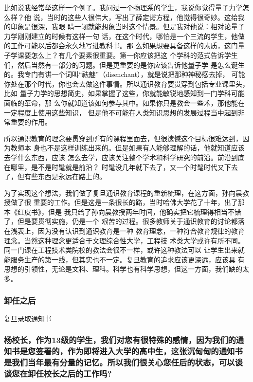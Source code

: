 \documentclass[11pt]{ctexart}
\begin{document}
{{{{比如说我经常举这样一个例子。我问过一个物理系的学生，我说你觉得量子力学怎么样？他
说，当时的这些人很伟大，写出了薛定谔方程，他觉得很奇妙。这给我的印象是很深，我眼
睛一闭就能想象当时这个情景。但是我对他说：相对论量子力学刚刚建立的时候有这样一句
话，在这个时代，哪怕是一个三流的学生，他做的工作可能以后都会永久地写进教科书。那
么如果想要具备这样的素质，这门量子学课要怎么上？有几个要素很重要。第一你应该把这
个学科的范式告诉学生们，然后当然有一部分的习题。但是更重要的是你应该告诉他量子学
是怎么诞生的。我专门有讲一个词叫“祛魅”（disenchant），就是说把那种神秘感去掉，
可能你处在那个时代，你也会去做这件事情。所以通识教育要贯穿到包括专业课里头，比如
量子力学的思想简史，如果掌握了这些，你就能敏锐地感知到一门学科可能面临的革命，那
么你就知道该如何参与其中。如果你只是教会一些术，那他能在一定程度上使用这些知识，
但是他不可能在人类知识思想的发展过程当中起到非常重要的作用。

所以通识教育的理念要贯穿到所有的课程里面去，但很遗憾这个目标很难达到，因为教师本
身也不是这样训练出来的。但是如果有人能够理解的话，他就知道应该去学什么东西，应该
怎么去学，应该关注整个学术和科学研究的前沿。前沿到底在哪里，是不是时髦就是前沿？
时髦没几年就下去了，又一个时髦时代又下去了，但有些东西是永远在路上的。

为了实现这个想法，我们做了复旦通识教育课程的重新梳理，在这方面，孙向晨教授做了很
重要的工作。但是这是一条很长的路，当时哈佛大学花了十年，出了那本《红皮书》，但是
我只给了孙向晨教授两年时间，他确实把它梳理得相当不错了，但是要贯彻实施，仍是一个
艰苦的过程。很多教师关于通识教育的讨论都落在浅表上，因为没有认识到通识教育是一种
教育理念，一种符合教育规律的教育理念。当然这种理念更适合于文理综合性大学，工程技
术类大学或许有所不同。同一门课在工程技术类院校的教法会很不一样，或许这种教法可以
让学生出来就能服务生产的第一线，但其实也不一定。复旦教育的追求应该更深远，应该具
有思想的引领性，无论是文科、理科。科学也有科学思想，但这一方面，我们缺的太多。

\subsubsection{卸任之后}
\label{sec:org2a41188}

复旦录取通知书

\subsubsection{杨校长，作为13级的学生，我们对您有很特殊的感情，因为我们的通知书是您签署的，作为即将进入大学的高中生，这张沉甸甸的通知书是我们当年最有分量的记忆。所以我们很关心您任后的状态，可以谈谈您在卸任校长之后的工作吗?}
\label{sec:org1458bda}





}}}}
\end{document}
